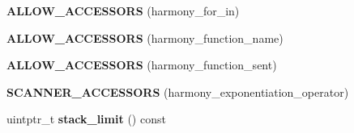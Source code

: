 \begin{DoxyCompactItemize}
\item 
{\bfseries A\+L\+L\+O\+W\+\_\+\+A\+C\+C\+E\+S\+S\+O\+RS} (harmony\+\_\+for\+\_\+in)\hypertarget{classv8_1_1internal_1_1_parser_base_add395965461edcdec7deae4ca247928a}{}\label{classv8_1_1internal_1_1_parser_base_add395965461edcdec7deae4ca247928a}

\item 
{\bfseries A\+L\+L\+O\+W\+\_\+\+A\+C\+C\+E\+S\+S\+O\+RS} (harmony\+\_\+function\+\_\+name)\hypertarget{classv8_1_1internal_1_1_parser_base_a234034a14161fed18d2d983229054bf6}{}\label{classv8_1_1internal_1_1_parser_base_a234034a14161fed18d2d983229054bf6}

\item 
{\bfseries A\+L\+L\+O\+W\+\_\+\+A\+C\+C\+E\+S\+S\+O\+RS} (harmony\+\_\+function\+\_\+sent)\hypertarget{classv8_1_1internal_1_1_parser_base_a5fcab9e3b14a0f518a4f697702f442e0}{}\label{classv8_1_1internal_1_1_parser_base_a5fcab9e3b14a0f518a4f697702f442e0}

\item 
{\bfseries S\+C\+A\+N\+N\+E\+R\+\_\+\+A\+C\+C\+E\+S\+S\+O\+RS} (harmony\+\_\+exponentiation\+\_\+operator)\hypertarget{classv8_1_1internal_1_1_parser_base_ab3ae7cc553904e8ef446f658c2161d53}{}\label{classv8_1_1internal_1_1_parser_base_ab3ae7cc553904e8ef446f658c2161d53}

\item 
uintptr\+\_\+t {\bfseries stack\+\_\+limit} () const \hypertarget{classv8_1_1internal_1_1_parser_base_a40042c03ebe03c940dc6afd04cf5f694}{}\label{classv8_1_1internal_1_1_parser_base_a40042c03ebe03c940dc6afd04cf5f694}

\end{DoxyCompactItemize}
